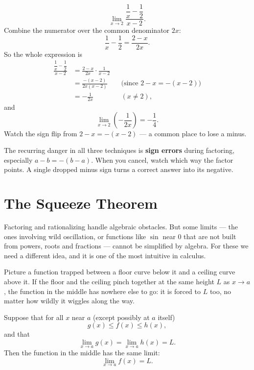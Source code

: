 \begin{example}
\label{ch07:ex-complex}
\[
  \lim_{x\to 2}\frac{\dfrac{1}{x}-\dfrac{1}{2}}{x-2}.
\]
Combine the numerator over the common denominator $2x$:
\[
  \frac{1}{x}-\frac{1}{2} = \frac{2-x}{2x}.
\]
So the whole expression is
\begin{align*}
  \frac{\dfrac{1}{x}-\dfrac{1}{2}}{x-2}
  &= \frac{2-x}{2x}\cdot\frac{1}{x-2}\\
  &= \frac{-(x-2)}{2x(x-2)}
    && \text{(since $2-x = -(x-2)$)}\\
  &= -\frac{1}{2x}
    && (x\neq 2),
\end{align*}
and
\[
  \lim_{x\to 2}\left(-\frac{1}{2x}\right) = -\frac{1}{4}.
\]
Watch the sign
flip from $2-x = -(x-2)$ --- a common place to lose a minus.
\end{example}

\begin{trapbox}
The recurring danger in all three techniques is \textbf{sign errors} during
factoring, especially $a-b = -(b-a)$. When you cancel, watch which way the
factor points. A single dropped minus sign turns a correct answer into its
negative.
\end{trapbox}

\section{The Squeeze Theorem}
\label{ch07:squeeze}

Factoring and rationalizing handle algebraic obstacles. But some limits ---
the ones involving wild oscillation, or functions like $\sin$ near $0$ that
are not built from powers, roots and fractions --- cannot be simplified by algebra. For these we need a different idea,
and it is one of the most intuitive in calculus.

\begin{intuitionbox}
Picture a function trapped between a floor curve below it and a ceiling curve above it.
If the floor and the ceiling pinch together at the same height $L$ as $x \to a$, the function in the middle has nowhere else to go: it is forced to $L$ too, no matter how wildly it wiggles along the way.
\end{intuitionbox}

\begin{theorem}
\label{ch07:thm-squeeze}
Suppose that for all $x$ near $a$ (except possibly at $a$ itself)
\[
  g(x) \le f(x) \le h(x),
\]
and that
\[
  \lim_{x\to a} g(x) = \lim_{x\to a} h(x) = L.
\]
Then the function in the middle has the same limit:
\[
  \lim_{x\to a} f(x) = L.
\]
\end{theorem}

